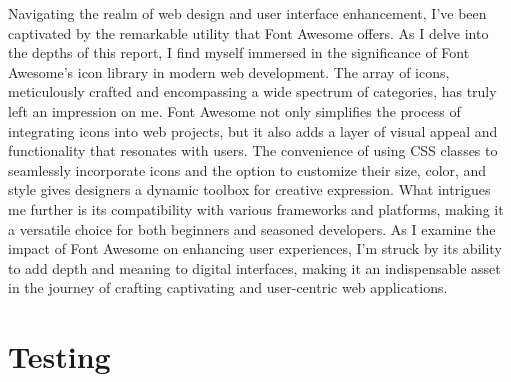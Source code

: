 \newline
Navigating the realm of web design and user interface enhancement, I've been captivated by the remarkable utility that Font Awesome offers. As I delve into the depths of this report, I find myself immersed in the significance of Font Awesome's icon library in modern web development. The array of icons, meticulously crafted and encompassing a wide spectrum of categories, has truly left an impression on me. Font Awesome not only simplifies the process of integrating icons into web projects, but it also adds a layer of visual appeal and functionality that resonates with users. The convenience of using CSS classes to seamlessly incorporate icons and the option to customize their size, color, and style gives designers a dynamic toolbox for creative expression. What intrigues me further is its compatibility with various frameworks and platforms, making it a versatile choice for both beginners and seasoned developers. As I examine the impact of Font Awesome on enhancing user experiences, I'm struck by its ability to add depth and meaning to digital interfaces, making it an indispensable asset in the journey of crafting captivating and user-centric web applications.
\newpage
\section{Testing}

